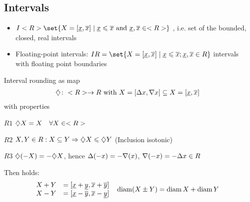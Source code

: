 \subsection*{Intervals}
	\begin{itemize}
		\item $I\R \set{X=[\minval{x},\maxval{x}] \mid \minval{x}\le \maxval{x}\nd \minval{x},\maxval{x} \in \R}$ , i.e. set of the bounded, closed, real intervals
		\item Floating-point intervals: $IR =  \set{X=[\minval{x},\maxval{x}] \mid \minval{x}\le \maxval{x}; \minval{x},\maxval{x} \in R}$ intervals with floating point boundaries
	\end{itemize}
\begin{definition}
	Interval rounding as map 
	\begin{align*}
		\diamondsuit \colon <R> \to R \text{ with } X=[\Delta x, \nabla x]\subseteq X=[\underline{x},\overline{x}]
	\end{align*}
	with properties
	\begin{defenum}
		\item $R1$ $\diamondsuit X=X \quad\forall X\in <R>$ \label{def_interval_rounding_1}
		\item $R2$ $X,Y\in R: X\subseteq Y \Rightarrow \diamondsuit X\leqslant \diamondsuit Y$ (Inclusion isotonic) \label{def_interval_rounding_2}
		\item $R3$ $\diamondsuit(-X)=-\diamondsuit X$, hence $\Delta(-x)=-\nabla(x)$, $\nabla(-x)=-\Delta x \in R$ \label{def_interval_rounding_3}
	\end{defenum}
	Then holds:
	\begin{align*}
	\begin{matrix}
	X + Y &= [\underline{x} + \underline{y}, \overline{x} + \overline{y}]\\
	X - Y &= [\underline{x} - \overline{y}, \overline{x} - \underline{y}]
	\end{matrix} \quad \operatorname{diam}(X\pm Y) = \operatorname{diam} X + \operatorname{diam} Y
	\end{align*}
\end{definition}

